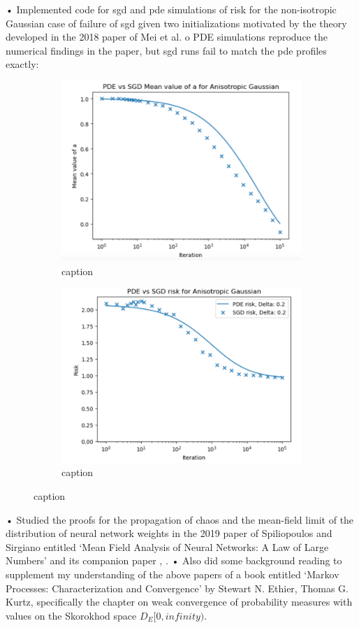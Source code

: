 \documentclass{article}
\begin{document}
•	Implemented code for sgd and pde simulations of risk for the non-isotropic Gaussian case of failure of sgd given two initializations motivated by the theory developed in the 2018 paper of Mei et al.
o	PDE simulations reproduce the numerical findings in the paper, but sgd runs fail to match the pde profiles exactly:
     \begin{figure}[H]
 \begin{subfigure}{0.5\textwidth}
   \centering
   \includegraphics[width=0.8\linewidth]{images/NGuyen2018-pde-sgd-gauss-anisotropic.png}
   \caption{ caption}
   \label{fig: description}
 \end{subfigure}%
 \begin{subfigure}{0.5\textwidth}
   \centering
   \includegraphics[width=0.8\linewidth]{images/NGuyen2018-pde-sgd-risk-gauss-anisotropic.png}
   \caption{ caption}
   \label{fig:  description}
 \end{subfigure}
 \caption{ caption}
 \label{fig:  label}
 \end{figure} 

 
•	Studied the proofs for the propagation of chaos and the mean-field limit of the distribution of neural network weights in the 2019 paper of Spiliopoulos and Sirgiano  entitled ‘Mean Field Analysis of Neural Networks: A Law of Large Numbers’ and its companion paper \cite{sirignano2019meanfieldanalysislln}, \cite{sirignano2019meanfieldanalysisclt}.
•	Also did some background reading to supplement my understanding of the above papers of a book entitled ‘Markov Processes: Characterization and Convergence’ by Stewart N. Ethier, Thomas G. Kurtz, specifically the chapter on weak convergence of probability measures with values on the Skorokhod space $D_E[0,infinity)$.
\end{document}
